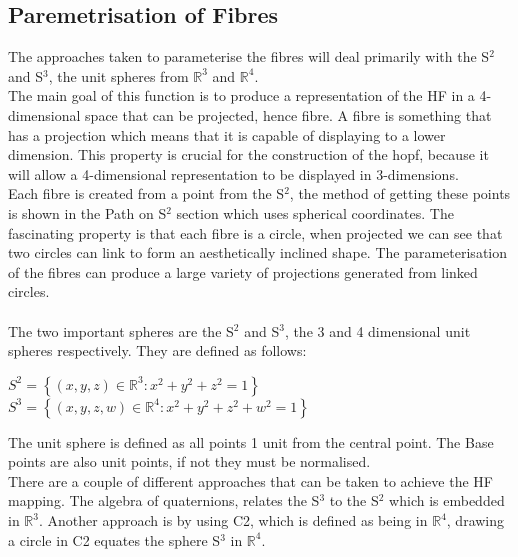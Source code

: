 \documentclass[12pt]{article} %
\begin{document}
\begin{flushleft}
\subsection{Paremetrisation of Fibres} %
The approaches taken to parameterise the fibres will deal primarily with the S$^{2}$ and S$^{3}$, the unit spheres from $\mathbb{R}^{3}$ and $\mathbb{R}^{4}$. \\
The main goal of this function is to produce a representation of the HF in a 4-dimensional space that can be projected, hence fibre. A fibre is something that has a projection which means that it is capable of displaying to a lower dimension. This property is crucial for the construction of the hopf, because it will allow a 4-dimensional representation to be displayed in 3-dimensions.\\
Each fibre is created from a point from the S$^{2}$, the method of getting these points is shown in the Path on S$^{2}$ section which uses spherical coordinates. The fascinating property is that each fibre is a circle, when projected we can see that two circles can link to form an aesthetically inclined shape. The parameterisation of the fibres can produce a large variety of projections generated from linked circles.
\paragraph{}The two important spheres are the S$^{2}$ and S$^{3}$, the 3 and 4 dimensional unit spheres respectively.
They are defined as follows:\\
\begin{center}
$S^{2} = \left \{ \left ( x, y, z \right ) \in \mathbb{R}^{3} : x^{2} + y^{2} + z^{2} = 1 \right \}$\\
$S^{3} = \left \{ \left ( x, y, z, w \right ) \in \mathbb{R}^{4} : x^{2} + y^{2} + z^{2} + w^{2} = 1 \right \}$\\
\end{center}
The unit sphere is defined as all points 1 unit from the central point. The Base points are also unit points, if not they must be normalised. \\
There are a couple of different approaches that can be taken to achieve the HF mapping. The algebra of quaternions, relates the S$^{3}$ to the S$^{2}$ which is embedded in $\mathbb{R}^{3}$. Another approach is by using C2, which is defined as being in $\mathbb{R}^{4}$, drawing a circle in C2 equates the sphere S$^{3}$ in $\mathbb{R}^{4}$. \\



\end{flushleft}
\end{document}
